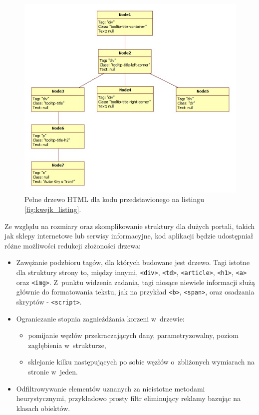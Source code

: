 \documentclass[a4paper,10pt]{article}
\begin{document}
\begin{figure}[h!]
\centering
  \includegraphics[width=.9\textwidth]{html_tree_full.jpg}
  \caption{Pełne drzewo HTML dla kodu przedstawionego na listingu \ref{fig:kwejk_listing}.}
  \label{fig:html_tree_full}
\end{figure}

Ze względu na rozmiary oraz skomplikowanie struktury dla dużych portali, takich jak sklepy internetowe lub serwisy informacyjne, kod aplikacji będzie udostępniał różne możliwości redukcji złożoności drzewa:

\begin{itemize}
 \item Zawężanie podzbioru tagów, dla których budowane jest drzewo. Tagi istotne dla struktury strony to, między innymi, \verb+<div>+, \verb+<td>+, \verb+<article>+, \verb+<h1>+, \verb+<a>+ oraz \verb+<img>+. Z~punktu widzenia zadania, tagi niosące niewiele informacji służą głównie do formatowania tekstu, jak na przykład \verb+<b>+, \verb+<span>+, oraz osadzania skryptów - \verb+<script>+.
 \item Ograniczanie stopnia zagnieżdżania korzeni w~drzewie:
    \begin{itemize}
	\item pomijanie węzłów przekraczających dany, parametryzowalny, poziom zagłębienia w~strukturze,
	\item sklejanie kilku następujących po sobie węzłów o~zbliżonych wymiarach na stronie w~jeden.
    \end{itemize}
 \item Odfiltrowywanie elementów uznanych za nieistotne metodami heurystycznymi, przykładowo prosty filtr eliminujący reklamy bazując na klasach obiektów.
\end{itemize}
\end{document}
